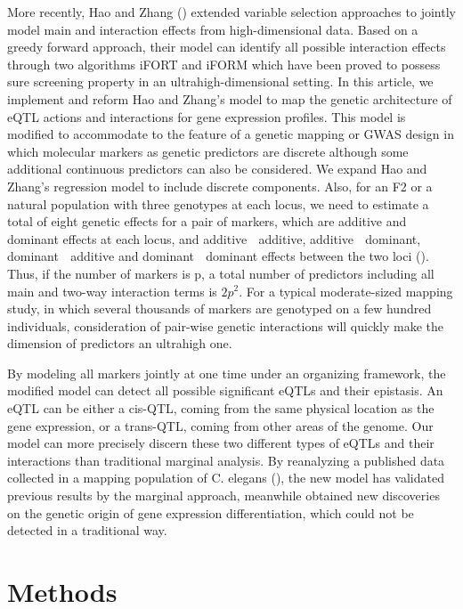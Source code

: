\documentclass[11pt,]{book}
\theoremstyle{definition}
\theoremstyle{definition}
\theoremstyle{remark}
\begin{document}
More recently, Hao and Zhang (\cite{hao2014interaction}) extended
variable selection approaches to jointly model main and interaction
effects from high-dimensional data. Based on a greedy forward approach,
their model can identify all possible interaction effects through two
algorithms iFORT and iFORM which have been proved to possess sure
screening property in an ultrahigh-dimensional setting. In this article,
we implement and reform Hao and Zhang's model to map the genetic
architecture of eQTL actions and interactions for gene expression
profiles. This model is modified to accommodate to the feature of a
genetic mapping or GWAS design in which molecular markers as genetic
predictors are discrete although some additional continuous predictors
can also be considered. We expand Hao and Zhang's regression model to
include discrete components. Also, for an F2 or a natural population
with three genotypes at each locus, we need to estimate a total of eight
genetic effects for a pair of markers, which are additive and dominant
effects at each locus, and additive  additive, additive  dominant,
dominant  additive and dominant  dominant effects between the two loci
(\cite{kempthorne1968correlation}). Thus, if the number of markers is p,
a total number of predictors including all main and two-way interaction
terms is \(2p^2\). For a typical moderate-sized mapping study, in which
several thousands of markers are genotyped on a few hundred individuals,
consideration of pair-wise genetic interactions will quickly make the
dimension of predictors an ultrahigh one.

By modeling all markers jointly at one time under an organizing
framework, the modified model can detect all possible significant eQTLs
and their epistasis. An eQTL can be either a cis-QTL, coming from the
same physical location as the gene expression, or a trans-QTL, coming
from other areas of the genome. Our model can more precisely discern
these two different types of eQTLs and their interactions than
traditional marginal analysis. By reanalyzing a published data collected
in a mapping population of C. elegans (\cite{rockman2010selection}), the
new model has validated previous results by the marginal approach,
meanwhile obtained new discoveries on the genetic origin of gene
expression differentiation, which could not be detected in a traditional
way.

\section{Methods}\label{methods}
\end{document}
